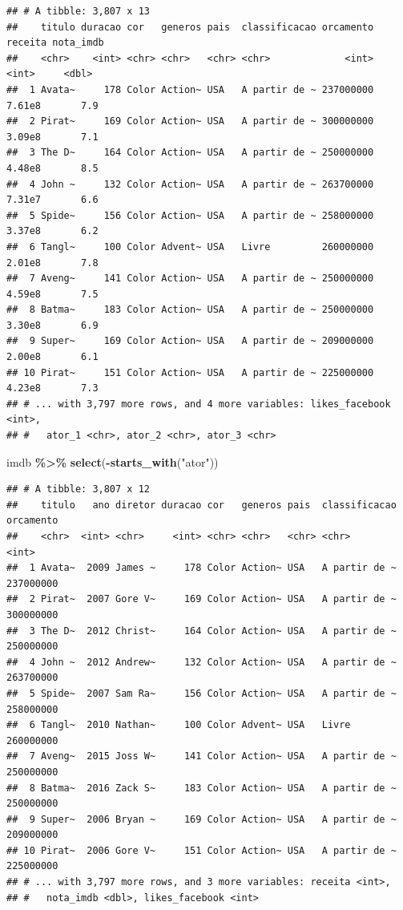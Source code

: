 \documentclass[
]{book}
\newenvironment{Shaded}{\begin{snugshade}}{\end{snugshade}}
\newcommand{\KeywordTok}[1]{\textcolor[rgb]{0.13,0.29,0.53}{\textbf{#1}}}
\newcommand{\NormalTok}[1]{#1}
\newcommand{\OperatorTok}[1]{\textcolor[rgb]{0.81,0.36,0.00}{\textbf{#1}}}
\newcommand{\StringTok}[1]{\textcolor[rgb]{0.31,0.60,0.02}{#1}}
\begin{document}
\begin{verbatim}
## # A tibble: 3,807 x 13
##    titulo duracao cor   generos pais  classificacao orcamento receita nota_imdb
##    <chr>    <int> <chr> <chr>   <chr> <chr>             <int>   <int>     <dbl>
##  1 Avata~     178 Color Action~ USA   A partir de ~ 237000000  7.61e8       7.9
##  2 Pirat~     169 Color Action~ USA   A partir de ~ 300000000  3.09e8       7.1
##  3 The D~     164 Color Action~ USA   A partir de ~ 250000000  4.48e8       8.5
##  4 John ~     132 Color Action~ USA   A partir de ~ 263700000  7.31e7       6.6
##  5 Spide~     156 Color Action~ USA   A partir de ~ 258000000  3.37e8       6.2
##  6 Tangl~     100 Color Advent~ USA   Livre         260000000  2.01e8       7.8
##  7 Aveng~     141 Color Action~ USA   A partir de ~ 250000000  4.59e8       7.5
##  8 Batma~     183 Color Action~ USA   A partir de ~ 250000000  3.30e8       6.9
##  9 Super~     169 Color Action~ USA   A partir de ~ 209000000  2.00e8       6.1
## 10 Pirat~     151 Color Action~ USA   A partir de ~ 225000000  4.23e8       7.3
## # ... with 3,797 more rows, and 4 more variables: likes_facebook <int>,
## #   ator_1 <chr>, ator_2 <chr>, ator_3 <chr>
\end{verbatim}

\begin{Shaded}
\begin{Highlighting}[]
\NormalTok{imdb }\OperatorTok{\%>\%}
\StringTok{  }\KeywordTok{select}\NormalTok{(}\OperatorTok{{-}}\KeywordTok{starts\_with}\NormalTok{(}\StringTok{"ator"}\NormalTok{))}
\end{Highlighting}
\end{Shaded}

\begin{verbatim}
## # A tibble: 3,807 x 12
##    titulo   ano diretor duracao cor   generos pais  classificacao orcamento
##    <chr>  <int> <chr>     <int> <chr> <chr>   <chr> <chr>             <int>
##  1 Avata~  2009 James ~     178 Color Action~ USA   A partir de ~ 237000000
##  2 Pirat~  2007 Gore V~     169 Color Action~ USA   A partir de ~ 300000000
##  3 The D~  2012 Christ~     164 Color Action~ USA   A partir de ~ 250000000
##  4 John ~  2012 Andrew~     132 Color Action~ USA   A partir de ~ 263700000
##  5 Spide~  2007 Sam Ra~     156 Color Action~ USA   A partir de ~ 258000000
##  6 Tangl~  2010 Nathan~     100 Color Advent~ USA   Livre         260000000
##  7 Aveng~  2015 Joss W~     141 Color Action~ USA   A partir de ~ 250000000
##  8 Batma~  2016 Zack S~     183 Color Action~ USA   A partir de ~ 250000000
##  9 Super~  2006 Bryan ~     169 Color Action~ USA   A partir de ~ 209000000
## 10 Pirat~  2006 Gore V~     151 Color Action~ USA   A partir de ~ 225000000
## # ... with 3,797 more rows, and 3 more variables: receita <int>,
## #   nota_imdb <dbl>, likes_facebook <int>
\end{verbatim}
\end{document}
